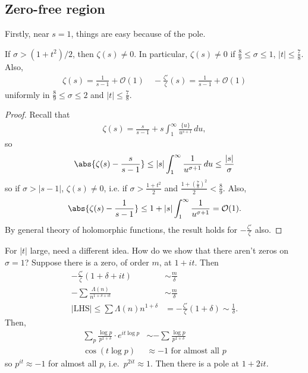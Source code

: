 \documentclass{article}
\newcommand{\1}{\mathbbm{1}}
\newcommand{\bigO}{\mathcal{O}}
\begin{document}
\subsection{Zero-free region}
\newlec
Firstly, near $s=1$, things are easy because of the pole.
\begin{thm}
  If $\sigma > (1+t^2)/2$, then $\zeta(s) \neq 0$. In particular, $\zeta(s) \neq 0$ if $\frac{8}{9} \leq \sigma \leq 1$, $|t| \leq \frac{7}{8}$.
  Also,
  \begin{align*}
    \zeta(s) = \frac{1}{s-1} + \bigO(1) \quad -\frac{\zeta'}{\zeta}(s) = \frac{1}{s-1} + \bigO(1)
  \end{align*}
  uniformly in $\frac{8}{9} \leq \sigma \leq 2$ and $|t| \leq \frac{7}{8}$.
\end{thm}
\begin{center}
\end{center}
\begin{proof}
  Recall that
  \begin{align*}
    \zeta(s) = \frac{s}{s-1} + s \int_1^\infty \frac{\{u\}}{u^{s+1}}\,du,
  \end{align*}
  so
  \begin{align*}
    \abs{\zeta(s) - \frac{s}{s-1}} \leq |s| \int_1^\infty \frac{1}{u^{\sigma+1}}\,du\leq \frac{|s|}\sigma
  \end{align*}
  so if $\sigma > |s-1|$, $\zeta(s)\neq0$, i.e. if $\sigma > \frac{1+t^2}{2}$ and $\frac{1+(\frac{7}{8})^2}{2} < \frac 89$.
  Also,
  \begin{equation*}
    \abs{\zeta(s) - \frac{1}{s-1}} \leq 1 + |s| \int_1^\infty \frac{1}{u^{\sigma+1}} = \bigO(1).
  \end{equation*}
  By general theory of holomorphic functions, the result holds for $-\frac{\zeta'}{\zeta}$ also.
\end{proof}
For $|t|$ large, need a different idea.
How do we show that there aren't zeros on $\sigma=1$?
Suppose there is a zero, of order $m$, at $1+it$.
Then
\begin{align*}
  -\frac{\zeta'}{\zeta}(1 + \delta + it) &\sim \frac{m}{\delta} \\
  -\sum \frac{\Lambda(n)}{n^{1+\delta+it}} &\sim \frac{m}{\delta} \\
  |\text{LHS}| \leq \sum {\Lambda(n)}{n^{1+\delta}} &= -\frac{\zeta'}{\zeta}(1+\delta) \sim \frac{1}{\delta}.
\end{align*}
Then,
\begin{align*}
  \sum_p \frac{\log p}{p^{1+\delta}} \cdot e^{it \log p} &\sim - \sum \frac{\log p}{p^{1+\delta}} \\
  \cos(t \log p) &\approx -1 \text{ for almost all } p
\end{align*}
so $p^{it} \approx -1$ for almost all $p$, i.e.\ $p^{2it} \approx 1$. Then there is a pole at $1 + 2it$.
\end{document}
